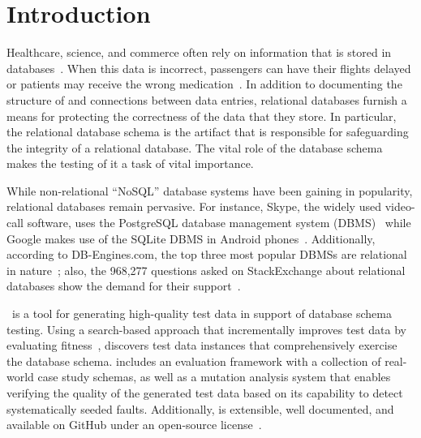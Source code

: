 \section{Introduction}\label{sec:intro}


Healthcare, science, and commerce often rely on information that is stored in
databases~\cite{kapfhammer2007comprehensive}.  When this data is incorrect, passengers can have their flights delayed or
patients may receive the wrong medication~\cite{databasebook}.  In addition to documenting the structure of and
connections between data entries, relational databases furnish a means for protecting the correctness of the data that
they store.  In particular, the relational database schema is the artifact that is responsible for safeguarding the
integrity of a relational database. The vital role of the database schema makes the testing of it a task of vital
importance.


While non-relational ``NoSQL'' database systems have been gaining in popularity, relational databases remain pervasive.
For instance, Skype, the widely used video-call software, uses the PostgreSQL database management system
(DBMS)~\cite{postgres} while Google makes use of the SQLite DBMS in Android phones~\cite{sqlite}.  Additionally,
according to DB-Engines.com, the top three most popular DBMSs are relational in nature~\cite{dbrank}; also, the 968,277
questions asked on StackExchange about relational databases show the demand for their support~\cite{stackexchange}.



\sa~is a tool for generating high-quality test data in support of database schema testing. Using a search-based approach
that incrementally improves test data by evaluating fitness~\cite{Korel:AVM}, {\sa} discovers test data instances that
comprehensively exercise the database schema.  {\sa} includes an evaluation framework with a collection of real-world
case study schemas, as well as a mutation analysis system that enables verifying the quality of the generated test data
based on its capability to detect systematically seeded faults.  Additionally, {\sa} is extensible, well documented, and
available on GitHub under an open-source license~\cite{tool}.

